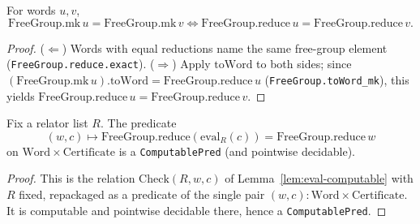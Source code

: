 \begin{lemma}
    \label{lem:mk-eq-iff-reduce}
    \leanok
    For words $u, v$,
    \[
        \mathrm{FreeGroup.mk}\,u = \mathrm{FreeGroup.mk}\,v
        \iff \mathrm{FreeGroup.reduce}\,u = \mathrm{FreeGroup.reduce}\,v.
    \]
\end{lemma}
\begin{proof}
    ($\Leftarrow$) Words with equal reductions name the same free-group element
    (\texttt{FreeGroup.reduce.exact}). ($\Rightarrow$) Apply $\mathrm{toWord}$ to
    both sides; since $(\mathrm{FreeGroup.mk}\,u).\mathrm{toWord} =
    \mathrm{FreeGroup.reduce}\,u$ (\texttt{FreeGroup.toWord\_mk}), this yields
    $\mathrm{FreeGroup.reduce}\,u = \mathrm{FreeGroup.reduce}\,v$.
\end{proof}

\begin{lemma}
    \label{lem:check-computablePred}
    Fix a relator list $R$. The predicate
    \[
        (w, c) \mapsto \mathrm{FreeGroup.reduce}(\mathrm{eval}_R(c))
            = \mathrm{FreeGroup.reduce}\,w
    \]
    on $\mathrm{Word} \times \mathrm{Certificate}$ is a \texttt{ComputablePred}
    (and pointwise decidable).
\end{lemma}
\begin{proof}
    This is the relation $\mathrm{Check}(R, w, c)$ of
    Lemma~\ref{lem:eval-computable} with $R$ fixed, repackaged as a predicate of
    the single pair $(w, c) : \mathrm{Word} \times \mathrm{Certificate}$. It is
    computable and pointwise decidable there, hence a \texttt{ComputablePred}.
\end{proof}

